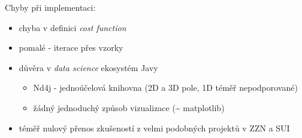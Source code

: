 \documentclass[presentation]{beamer}
\begin{document}
\begin{frame}[label={sec:orge94cc45}]{Chyby při implementaci:}
\begin{itemize}
\item chyba v definici \emph{cost function}
\item pomalé - iterace přes vzorky
\item důvěra v \emph{data science} ekosystém Javy
\begin{itemize}
\item Nd4j - jednoúčelová knihovna (2D a 3D pole, 1D téměř nepodporované)
\item žádný jednoduchý způsob vizualizace (\textasciitilde{} matplotlib)
\end{itemize}
\item téměř nulový přenos zkušeností z velmi podobných projektů v ZZN a SUI
\end{itemize}
\end{frame}
\end{document}
